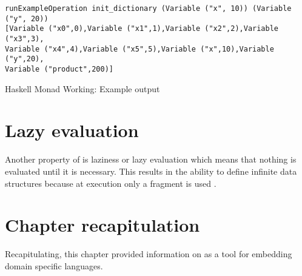 \documentclass[thesis-solanki.tex]{subfiles}
\begin{document}
\begin{code-list}[H]
  \begin{singlespace}
\begin{verbatim}
runExampleOperation init_dictionary (Variable ("x", 10)) (Variable ("y", 20))
[Variable ("x0",0),Variable ("x1",1),Variable ("x2",2),Variable ("x3",3),
Variable ("x4",4),Variable ("x5",5),Variable ("x",10),Variable ("y",20),
Variable ("product",200)]
\end{verbatim}
  \end{singlespace}
  \caption{Haskell Monad Working: Example output}
\label{tab:hskllmndworkngexamplesoutput}
\end{code-list}


\section{Lazy evaluation}
Another property of  is laziness or lazy evaluation which means that nothing is evaluated until
it is necessary.
This results in the ability to define infinite data structures because at execution only a fragment is used
\cite{website:haskelllazinesswiki}.



\section{Chapter recapitulation}
Recapitulating, this chapter provided information on  as a tool for embedding domain specific languages.


\ifMain
\begin{scope}
  \nolinenumbers
  \enotesize
  \par
  \begin{singlespace}
  \setlength{\parskip}{12pt plus 2pt minus 1pt}
  \theendnotes
  \par
  \end{singlespace}
\end{scope}
\fi
\end{document}
